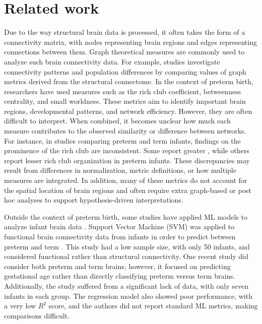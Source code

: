 \documentclass[doubleblind]{ecai}
\begin{document}
\section{Related work}

Due to the way structural brain data is processed, it often takes the form of a connectivity matrix, with nodes representing brain regions and edges representing connections between them. Graph theoretical measures are commonly used to analyze such brain connectivity data. For example, studies investigate connectivity patterns and population differences by comparing values of graph metrics derived from the structural connectome. In the context of preterm birth, researchers have used measures such as the rich club coefficient, betweenness centrality, and small worldness. These metrics aim to identify important brain regions, developmental patterns, and network efficiency. However, they are often difficult to interpret. When combined, it becomes unclear how much each measure contributes to the observed similarity or difference between networks. For instance, in studies comparing preterm and term infants, findings on the prominence of the rich club are inconsistent. Some report greater \cite{karolis2016reinforcement}, while others report lesser \cite{de2021preterm} rich club organization in preterm infants. These discrepancies may result from differences in normalization, metric definitions, or how multiple measures are integrated. In addition, many of these metrics do not account for the spatial location of brain regions and often require extra graph-based or post hoc analyses to support hypothesis-driven interpretations.

Outside the context of preterm birth, some studies have applied ML models to analyze infant brain data \cite{scheinost2023machine, suranyi2021segmentation}. Support Vector Machine (SVM) was applied to functional brain connectivity data from infants in order to predict between preterm and term \cite{smyser2016prediction}. This study had a low sample size, with only 50 infants, and considered functional rather than structural connectivity. One recent study \cite{taoudi2022predicting} did consider both preterm and term brains; however, it focused on predicting gestational age rather than directly classifying preterm versus term brains. Additionally, the study suffered from a significant lack of data, with only seven infants in each group. The regression model also showed poor performance, with a very low $R^2$ score, and the authors did not report standard ML metrics, making comparisons difficult.
\end{document}
